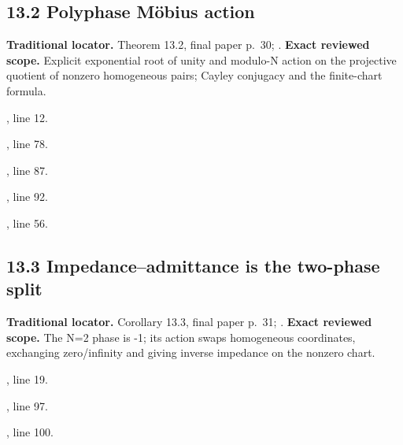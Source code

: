 \subsection{13.2 Polyphase Möbius action}
\label{result:13.2}
\textbf{Traditional locator.} Theorem 13.2, final paper p.~30; .
\textbf{Exact reviewed scope.} Explicit exponential root of unity and modulo-N action on the projective quotient of nonzero homogeneous pairs; Cayley conjugacy and the finite-chart formula.
{\small{}\par}
{\footnotesize\color{muted}, line 12.\par}\smallskip
{\small{}\par}
{\footnotesize\color{muted}, line 78.\par}\smallskip
{\small{}\par}
{\footnotesize\color{muted}, line 87.\par}\smallskip
{\small{}\par}
{\footnotesize\color{muted}, line 92.\par}\smallskip
{\small{}\par}
{\footnotesize\color{muted}, line 56.\par}\smallskip
{}
\subsection{13.3 Impedance–admittance is the two-phase split}
\label{result:13.3}
\textbf{Traditional locator.} Corollary 13.3, final paper p.~31; .
\textbf{Exact reviewed scope.} The N=2 phase is -1; its action swaps homogeneous coordinates, exchanging zero/infinity and giving inverse impedance on the nonzero chart.
{\small{}\par}
{\footnotesize\color{muted}, line 19.\par}\smallskip
{\small{}\par}
{\footnotesize\color{muted}, line 97.\par}\smallskip
{\small{}\par}
{\footnotesize\color{muted}, line 100.\par}\smallskip
{}
